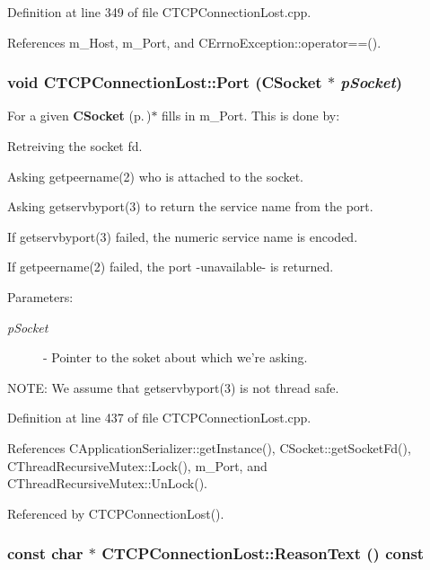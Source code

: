 Definition at line 349 of file CTCPConnection\-Lost.cpp.

References m\_\-Host, m\_\-Port, and CErrno\-Exception::operator==().
\subsubsection{\setlength{\rightskip}{0pt plus 5cm}void CTCPConnection\-Lost::Port ({\bf CSocket} $\ast$ {\em p\-Socket})\hspace{0.3cm}{\tt  [protected]}}\label{classCTCPConnectionLost_b3}


For a given {\bf CSocket} {\rm (p.\,\pageref{classCSocket})}$\ast$ fills in m\_\-Port. This is done by:\begin{CompactItemize}
\item 
Retreiving the socket fd.\item 
Asking getpeername(2) who is attached to the socket.\item 
Asking getservbyport(3) to return the service name from the port.\item 
If getservbyport(3) failed, the numeric service name is encoded.\item 
If getpeername(2) failed, the port -unavailable- is returned.\end{CompactItemize}
\begin{Desc}
\item[Parameters: ]\par
\begin{description}
\item[{\em 
p\-Socket}]- Pointer to the soket about which we're asking.\end{description}
\end{Desc}
NOTE: We assume that getservbyport(3) is not thread safe. 

Definition at line 437 of file CTCPConnection\-Lost.cpp.

References CApplication\-Serializer::get\-Instance(), CSocket::get\-Socket\-Fd(), CThread\-Recursive\-Mutex::Lock(), m\_\-Port, and CThread\-Recursive\-Mutex::Un\-Lock().

Referenced by CTCPConnection\-Lost().
\subsubsection{\setlength{\rightskip}{0pt plus 5cm}const char $\ast$ CTCPConnection\-Lost::Reason\-Text () const\hspace{0.3cm}{\tt  [virtual]}}\label{classCTCPConnectionLost_a7}



